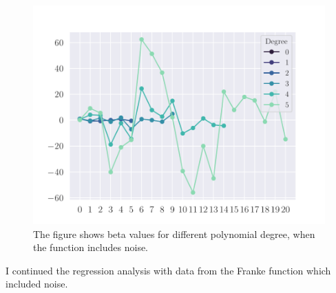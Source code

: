 \begin{figure}
    \centering
    \includegraphics[width=0.9\linewidth]{project-1/latex/figures/ols_beta_noisy.pdf}
    \caption{The figure shows beta values for different polynomial degree, when the function includes noise.}
    \label{fig:ols_beta_noisy}
\end{figure}

I continued the regression analysis with data from the Franke function which included noise.